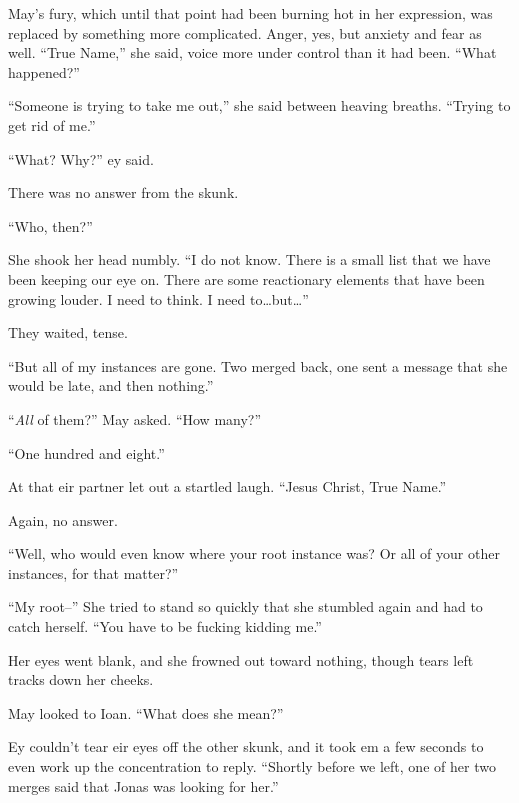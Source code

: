 May's fury, which until that point had been burning hot in her expression, was replaced by something more complicated. Anger, yes, but anxiety and fear as well. ``True Name,'' she said, voice more under control than it had been. ``What happened?''

``Someone is trying to take me out,'' she said between heaving breaths. ``Trying to get rid of me.''

``What? Why?'' ey said.

There was no answer from the skunk.

``Who, then?''

She shook her head numbly. ``I do not know. There is a small list that we have been keeping our eye on. There are some reactionary elements that have been growing louder. I need to think. I need to\ldots but\ldots{}''

They waited, tense.

``But all of my instances are gone. Two merged back, one sent a message that she would be late, and then nothing.''

``\emph{All} of them?'' May asked. ``How many?''

``One hundred and eight.''

At that eir partner let out a startled laugh. ``Jesus Christ, True Name.''

Again, no answer.

``Well, who would even know where your root instance was? Or all of your other instances, for that matter?''

``My root--'' She tried to stand so quickly that she stumbled again and had to catch herself. ``You have to be fucking kidding me.''

Her eyes went blank, and she frowned out toward nothing, though tears left tracks down her cheeks.

May looked to Ioan. ``What does she mean?''

Ey couldn't tear eir eyes off the other skunk, and it took em a few seconds to even work up the concentration to reply. ``Shortly before we left, one of her two merges said that Jonas was looking for her.''
